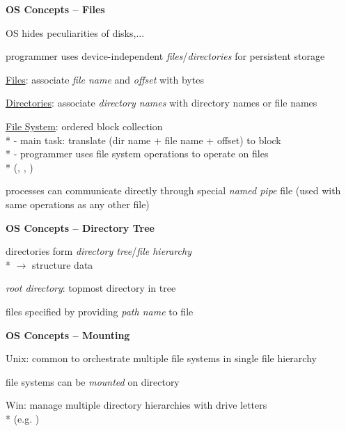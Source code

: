 \newpage

\textbf{OS Concepts -- Files}
\begin{items}
	\item OS hides peculiarities of disks,...
	\item programmer uses device-independent \emph{files}/\emph{directories} for persistent storage
	\item \underline{Files}: associate \emph{file name} and \emph{offset} with bytes
	\item \underline{Directories}: associate \emph{directory names} with directory names or file names
	\item \underline{File System}: ordered block collection \\*
		- main task: translate (dir name + file name + offset) to block \\*
		- programmer uses file system operations to operate on files \\* \phantom{-} (, , )
	\item processes can communicate directly through special \emph{named pipe} file (used with same operations as any other file)
\end{items}

\textbf{OS Concepts -- Directory Tree}
\begin{items}
	\item directories form \emph{directory tree}/\emph{file hierarchy} \\*
		\( \to \) structure data
	\item \emph{root directory}: topmost directory in tree
	\item files specified by providing \emph{path name} to file
\end{items}

\textbf{OS Concepts -- Mounting}
\begin{items}
	\item Unix: common to orchestrate multiple file systems in single file hierarchy
	\item file systems can be \emph{mounted} on directory
	\item Win: manage multiple directory hierarchies with drive letters
		\\*
		(e.g. )
\end{items}

